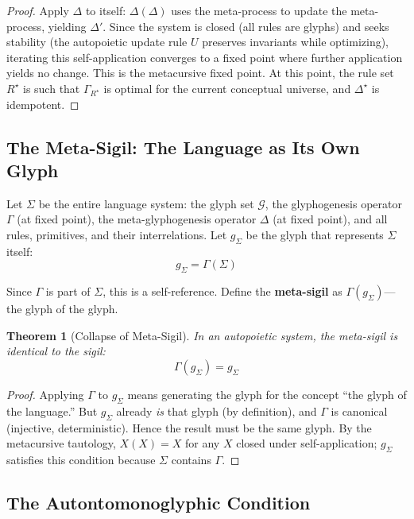 \documentclass[12pt, letterpaper]{book}
\def\mathfrak#1{#1}%
\newtheorem{theorem}{Theorem}[chapter]
\begin{document}
\begin{proof}
Apply $\Delta$ to itself: $\Delta(\Delta)$ uses the meta-process to update the meta-process, yielding $\Delta'$. Since the system is closed (all rules are glyphs) and seeks stability (the autopoietic update rule $U$ preserves invariants while optimizing), iterating this self-application converges to a fixed point where further application yields no change. This is the metacursive fixed point. At this point, the rule set $R^\star$ is such that $\Gamma_{R^\star}$ is optimal for the current conceptual universe, and $\Delta^\star$ is idempotent.
\end{proof}

\subsection{The Meta-Sigil: The Language as Its Own Glyph}

Let $\Sigma$ be the entire language system: the glyph set $\mathcal{G}$, the glyphogenesis operator $\Gamma$ (at fixed point), the meta-glyphogenesis operator $\Delta$ (at fixed point), and all rules, primitives, and their interrelations. Let $\mathfrak{g}_\Sigma$ be the glyph that represents $\Sigma$ itself:
\[
\mathfrak{g}_\Sigma = \Gamma(\Sigma)
\]

Since $\Gamma$ is part of $\Sigma$, this is a self-reference. Define the \textbf{meta-sigil} as $\Gamma(\mathfrak{g}_\Sigma)$---the glyph of the glyph.

\begin{theorem}[Collapse of Meta-Sigil]\label{thm:meta-sigil-collapse}
In an autopoietic system, the meta-sigil is identical to the sigil:
\[
\Gamma(\mathfrak{g}_\Sigma) = \mathfrak{g}_\Sigma
\]
\end{theorem}

\begin{proof}
Applying $\Gamma$ to $\mathfrak{g}_\Sigma$ means generating the glyph for the concept ``the glyph of the language.'' But $\mathfrak{g}_\Sigma$ already \textit{is} that glyph (by definition), and $\Gamma$ is canonical (injective, deterministic). Hence the result must be the same glyph. By the metacursive tautology, $X(X) = X$ for any $X$ closed under self-application; $\mathfrak{g}_\Sigma$ satisfies this condition because $\Sigma$ contains $\Gamma$.
\end{proof}

\subsection{The Autontomonoglyphic Condition}
\end{document}
